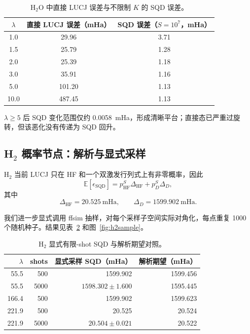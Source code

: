 \documentclass[UTF8,12pt,a4paper]{ctexart}
\begin{document}
\begin{table}[H]
\centering
\caption{H$_2$O 中直接 LUCJ 误差与不限制 $K$ 的 SQD 误差。}
\label{tab:saturation}
\begin{tabular}{ccc}
\toprule
$\lambda$ & 直接 LUCJ 误差（mHa） & SQD 误差（$S=10^7$，mHa） \\
\midrule
1.0 & 29.96 & 3.71 \\
1.5 & 25.79 & 1.28 \\
2.0 & 25.39 & 1.18 \\
3.0 & 35.91 & 1.16 \\
5.0 & 101.20 & 1.13 \\
10.0 & 487.45 & 1.13 \\
\bottomrule
\end{tabular}
\end{table}

$\lambda\ge5$ 后 SQD 变化范围仅约 0.0058~mHa，形成清晰平台；直接态已严重过旋转，但该恶化没有传递为 SQD 回升。

\subsection{\texorpdfstring{H$_2$}{H2} 概率节点：解析与显式采样}

H$_2$ 当前 LUCJ 只在 HF 和一个双激发行列式上有非零概率，因此
\begin{equation}
\mathbb E[\epsilon_{\mathrm{SQD}}]
=p_{\mathrm{HF}}^S\Delta_{\mathrm{HF}}
+p_D^S\Delta_D,
\end{equation}
其中
\begin{equation}
\Delta_{\mathrm{HF}}=20.525\ \mathrm{mHa},
\qquad
\Delta_D=1599.902\ \mathrm{mHa}.
\end{equation}

我们进一步显式调用 ffsim 抽样，对每个采样子空间实际对角化，每点重复 1000 个随机种子。结果见表~\ref{tab:h2sample} 和图~\ref{fig:h2sample}。

\begin{table}[H]
\centering
\caption{H$_2$ 显式有限-shot SQD 与解析期望对照。}
\label{tab:h2sample}
\begin{tabular}{rrrr}
\toprule
$\lambda$ & shots & 显式采样 SQD（mHa） & 解析期望（mHa） \\
\midrule
55.5 & 500 & 1599.902 & 1599.456 \\
55.5 & 5000 & $1598.302\pm1.600$ & 1595.445 \\
166.4 & 500 & 1599.902 & 1599.623 \\
221.9 & 500 & 20.525 & 20.524 \\
221.9 & 5000 & $20.504\pm0.021$ & 20.522 \\
\bottomrule
\end{tabular}
\end{table}
\end{document}
